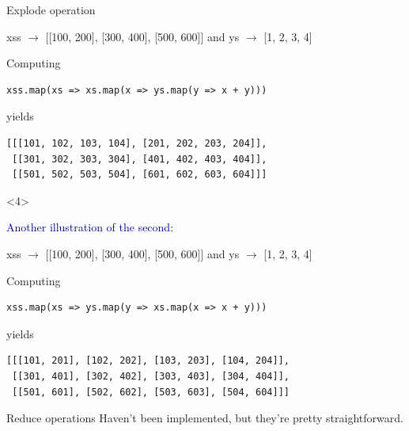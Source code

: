 \documentclass{beamer}
\begin{document}
\begin{frame}[fragile]{Explode operation}
\begin{onlyenv}
\begin{center}
\begin{minipage}{0.8\linewidth}
\vspace{0.2 cm}
xss $\to$ [[100, 200], [300, 400], [500, 600]] and ys $\to$ [1, 2, 3, 4]

\vspace{0.2 cm}
Computing
\begin{verbatim}
xss.map(xs => xs.map(x => ys.map(y => x + y)))
\end{verbatim}

yields

\vspace{-0.4 cm}
\begin{verbatim}
[[[101, 102, 103, 104], [201, 202, 203, 204]],
 [[301, 302, 303, 304], [401, 402, 403, 404]],
 [[501, 502, 503, 504], [601, 602, 603, 604]]]
\end{verbatim}
\end{minipage}
\end{center}
\end{onlyenv}
\begin{onlyenv}<4>
\begin{center}
\begin{minipage}{0.8\linewidth}
\scriptsize
\vspace{0.3 cm}
\textcolor{darkblue}{Another illustration of the second:}

\vspace{0.2 cm}
xss $\to$ [[100, 200], [300, 400], [500, 600]] and ys $\to$ [1, 2, 3, 4]

\vspace{0.2 cm}
Computing
\begin{verbatim}
xss.map(xs => ys.map(y => xs.map(x => x + y)))
\end{verbatim}

yields

\vspace{-0.4 cm}
\begin{verbatim}
[[[101, 201], [102, 202], [103, 203], [104, 204]],
 [[301, 401], [302, 402], [303, 403], [304, 404]],
 [[501, 601], [502, 602], [503, 603], [504, 604]]]
\end{verbatim}
\end{minipage}
\end{center}
\end{onlyenv}
\end{frame}

\begin{frame}{Reduce operations}
Haven't been implemented, but they're pretty straightforward.
\end{frame}
\end{document}
